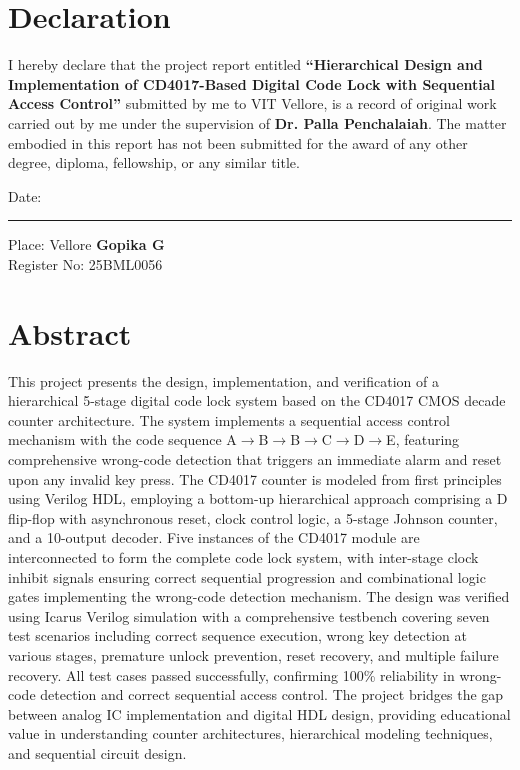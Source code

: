 \documentclass[12pt,a4paper]{report}
\begin{document}
\chapter*{Declaration}

I hereby declare that the project report entitled \textbf{``Hierarchical Design and Implementation of CD4017-Based Digital Code Lock with Sequential Access Control''} submitted by me to VIT Vellore, is a record of original work carried out by me under the supervision of \textbf{Dr. Palla Penchalaiah}. The matter embodied in this report has not been submitted for the award of any other degree, diploma, fellowship, or any similar title.

\vspace{2cm}
\noindent Date: \rule{3cm}{0.4pt} \hfill Place: Vellore
\vspace{1.5cm}
\noindent\textbf{Gopika G}\\Register No: 25BML0056

\clearpage
\tableofcontents
\clearpage
{}
\listoffigures
\clearpage
{}
\listoftables

\clearpage
\chapter*{Abstract}

This project presents the design, implementation, and verification of a hierarchical 5-stage digital code lock system based on the CD4017 CMOS decade counter architecture. The system implements a sequential access control mechanism with the code sequence A$\rightarrow$B$\rightarrow$B$\rightarrow$C$\rightarrow$D$\rightarrow$E, featuring comprehensive wrong-code detection that triggers an immediate alarm and reset upon any invalid key press. The CD4017 counter is modeled from first principles using Verilog HDL, employing a bottom-up hierarchical approach comprising a D flip-flop with asynchronous reset, clock control logic, a 5-stage Johnson counter, and a 10-output decoder. Five instances of the CD4017 module are interconnected to form the complete code lock system, with inter-stage clock inhibit signals ensuring correct sequential progression and combinational logic gates implementing the wrong-code detection mechanism. The design was verified using Icarus Verilog simulation with a comprehensive testbench covering seven test scenarios including correct sequence execution, wrong key detection at various stages, premature unlock prevention, reset recovery, and multiple failure recovery. All test cases passed successfully, confirming 100\% reliability in wrong-code detection and correct sequential access control. The project bridges the gap between analog IC implementation and digital HDL design, providing educational value in understanding counter architectures, hierarchical modeling techniques, and sequential circuit design.
\end{document}
